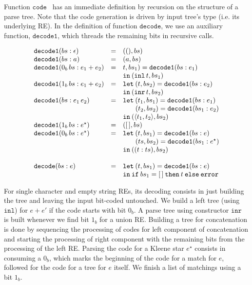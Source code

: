 \documentclass[oneside,12pt]{scrbook}
\theoremstyle{definition}
\newcommand{\inl}{\ensuremath{\texttt{inl}}}
\newcommand{\inr}{\ensuremath{\texttt{inr}}}
\newcommand{\code}{\ensuremath{\texttt{code}}}
\newcommand{\decodee}{\ensuremath{\texttt{decode}}}
\newcommand{\decodeo}{\ensuremath{\texttt{decode1}}}
\newcommand{\leti}{\ensuremath{\texttt{let}}}
\newcommand{\iin}{\ensuremath{\texttt{in}}}
\newcommand{\iif}{\ensuremath{\texttt{if}}}
\newcommand{\tthen}{\ensuremath{\texttt{then}}}
\newcommand{\eelse}{\ensuremath{\texttt{else}}}
\newcommand{\eerror}{\ensuremath{\texttt{error}}}
\theoremstyle{plain}
\theoremstyle{definition}
\begin{document}
Function \code~ has an immediate definition by recursion on the structure of a parse tree.
Note that the code generation is driven by input tree's type (i.e. its underlying RE).
In the definition of function \decodee, we use an auxiliary function, \decodeo, which 
threads the remaining bits in recursive calls.

\[
\begin{array}{lcl}
	\decodeo (bs : \epsilon) & = & ((), bs) \\
	\decodeo (bs : a)        & = & (a , bs) \\
	\decodeo (0_b\,bs : e_1 + e_2) & = & \let \:(t,bs_1) = \decodeo (bs : e_1)\\
	&   & \iin\:(\inl\,t,bs_1)\\ 
	\decodeo (1_b\,bs : e_1 + e_2) & = & \leti\:(t,bs_2) = \decodeo (bs : e_2)\\
	&   & \iin\:(\inr\,t,bs_2)\\ 
	\decodeo (bs : e_1\,e_2) & = & \leti\:(t_1,bs_1) = \decodeo(bs : e_1) \\
	&   & \,\,\,\,\,\,\,\,\,\,\,(t_2,bs_2) = \decodeo(bs_1 : e_2)\\
	&   & \iin\:(\langle t_1,t_2\rangle, bs_2)\\
	\decodeo (1_b\,bs : e^\star) & = & ([\,],bs)\\
	\decodeo (0_b\,bs : e^\star) & = & \leti\:(t,bs_1) = \decodeo (bs : e)\\
	&   & \,\,\,\,\,\,\,\,\,\,\,(ts,bs_2) = \decodeo(bs_1 : e ^\star) \\ 
	&   & \iin\: ((t : ts), bs_2)\\
	\\
	\decodee (bs : e) & = & \leti\:(t,bs_1) = \decodeo(bs : e)\\
	&   & \iin\:\iif\:bs_1 = [\,]\:\tthen\:t\:\eelse\:\eerror \\
	\end{array}
\]


For single character and empty string REs, its decoding consists in just building
the tree and leaving the input bit-coded untouched. We build a left tree (using \inl)
for $e + e'$ if the code starts with bit $0_b$. A parse tree using constructor \inr~ is built
whenever we find bit $1_b$ for a union RE. Building a tree for concatenation is done by
sequencing the processing of codes for left component of concatenation and starting the
processing of right component with the remaining bits from the processing of the
left RE. Parsing the code for a Kleene star $e^\star$ consists in consuming a $0_b$, which
marks the beginning of the code for a match for $e$, followed for the code for a
tree for $e$ itself. We finish a list of matchings using a bit $1_b$.
\end{document}
